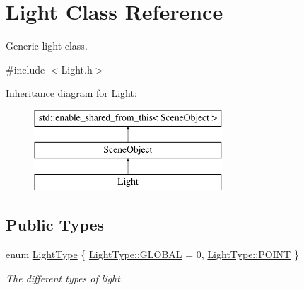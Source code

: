 \hypertarget{class_light}{}\section{Light Class Reference}
\label{class_light}


Generic light class.  




{\ttfamily \#include $<$Light.\+h$>$}

Inheritance diagram for Light\+:\begin{figure}[H]
\begin{center}
\leavevmode
\includegraphics[height=3.000000cm]{class_light}
\end{center}
\end{figure}
\subsection*{Public Types}
\begin{DoxyCompactItemize}
\item 
enum \hyperlink{class_light_a661d9480e01af8b1612860b9630ef5f8}{Light\+Type} \{ \hyperlink{class_light_a661d9480e01af8b1612860b9630ef5f8a6eecfba72d12922ee1dead07a0ef3334}{Light\+Type\+::\+G\+L\+O\+B\+A\+L} = 0, 
\hyperlink{class_light_a661d9480e01af8b1612860b9630ef5f8aaebdbcb765394d25d6a604589a890f82}{Light\+Type\+::\+P\+O\+I\+N\+T}
 \}
\begin{DoxyCompactList}\small\item\em The different types of light. \end{DoxyCompactList}\end{DoxyCompactItemize}
